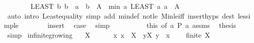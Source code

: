 \begin{isabellebody}
\ \ \ \ \ \ \isamarkupfalse%
\ {\isachardoublequoteopen}{\isacharparenleft}{\kern0pt}LEAST\ b{\isachardot}{\kern0pt}\ b\ {\isacharequal}{\kern0pt}\ a\ {\isasymor}\ b\ {\isasymin}\ A{\isacharparenright}{\kern0pt}\ {\isacharequal}{\kern0pt}\ min\ a\ {\isacharparenleft}{\kern0pt}LEAST\ a{\isachardot}{\kern0pt}\ a\ {\isasymin}\ A{\isacharparenright}{\kern0pt}{\isachardoublequoteclose}\isanewline
\ \ \ \ \ \ \ \ \isamarkupfalse%
\ {\isacharparenleft}{\kern0pt}auto\ intro{\isacharbang}{\kern0pt}{\isacharcolon}{\kern0pt}\ Least{\isacharunderscore}{\kern0pt}equality\ simp\ add{\isacharcolon}{\kern0pt}\ min{\isacharunderscore}{\kern0pt}def\ not{\isacharunderscore}{\kern0pt}le\ Min{\isacharunderscore}{\kern0pt}le{\isacharunderscore}{\kern0pt}iff\ insert{\isachardot}{\kern0pt}hyps\ dest{\isacharbang}{\kern0pt}{\isacharcolon}{\kern0pt}\ less{\isacharunderscore}{\kern0pt}imp{\isacharunderscore}{\kern0pt}le{\isacharparenright}{\kern0pt}\isanewline
\ \ \ \ \ \ \isamarkupfalse%
\ insert\ \isamarkupfalse%
\ {\isacharquery}{\kern0pt}case\ \isamarkupfalse%
\ simp\isanewline
\ \ \ \ \isamarkupfalse%
\isanewline
\ \ \isacommand{{\isacharbraceright}{\kern0pt}}\isamarkupfalse%
\ \isamarkupfalse%
\ this\ {\isacharbrackleft}{\kern0pt}of\ {\isachardoublequoteopen}{\isacharbraceleft}{\kern0pt}a{\isachardot}{\kern0pt}\ P\ a{\isacharbraceright}{\kern0pt}{\isachardoublequoteclose}{\isacharbrackright}{\kern0pt}\ assms\ \isamarkupfalse%
\ {\isacharquery}{\kern0pt}thesis\ \isamarkupfalse%
\ simp\isanewline
{}\isamarkupfalse%
%
\endisatagproof
{\isafoldproof}%
%
\isadelimproof
\isanewline
%
\endisadelimproof
\isanewline
{}\isamarkupfalse%
\ infinite{\isacharunderscore}{\kern0pt}growing{\isacharcolon}{\kern0pt}\isanewline
\ \ \ {\isachardoublequoteopen}X\ {\isasymnoteq}\ {\isacharbraceleft}{\kern0pt}{\isacharbraceright}{\kern0pt}{\isachardoublequoteclose}\isanewline
\ \ \ {\isacharasterisk}{\kern0pt}{\isacharcolon}{\kern0pt}\ {\isachardoublequoteopen}{\isasymAnd}x{\isachardot}{\kern0pt}\ x\ {\isasymin}\ X\ {\isasymLongrightarrow}\ {\isasymexists}y{\isasymin}X{\isachardot}{\kern0pt}\ y\ {\isachargreater}{\kern0pt}\ x{\isachardoublequoteclose}\isanewline
\ \ \ {\isachardoublequoteopen}{\isasymnot}\ finite\ X{\isachardoublequoteclose}\isanewline
%
\isadelimproof
%
\endisadelimproof
%
\isatagproof
{}\isamarkupfalse%
\isanewline
\ \ \isamarkupfalse%

\end{isabellebody}
